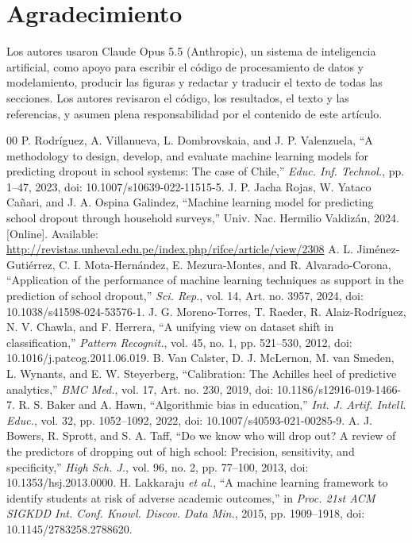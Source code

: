 \documentclass[conference]{IEEEtran}
\begin{document}
\section*{Agradecimiento}
Los autores usaron Claude Opus 5.5 (Anthropic), un sistema de inteligencia artificial, como apoyo para escribir el código de procesamiento de datos y modelamiento, producir las figuras y redactar y traducir el texto de todas las secciones. Los autores revisaron el código, los resultados, el texto y las referencias, y asumen plena responsabilidad por el contenido de este artículo.

\begin{thebibliography}{00}
 P. Rodríguez, A. Villanueva, L. Dombrovskaia, and J. P. Valenzuela, ``A methodology to design, develop, and evaluate machine learning models for predicting dropout in school systems: The case of Chile,'' \textit{Educ. Inf. Technol.}, pp. 1--47, 2023, doi: 10.1007/s10639-022-11515-5.
 J. P. Jacha Rojas, W. Yataco Cañari, and J. A. Ospina Galindez, ``Machine learning model for predicting school dropout through household surveys,'' Univ. Nac. Hermilio Valdizán, 2024. [Online]. Available: \url{http://revistas.unheval.edu.pe/index.php/rifce/article/view/2308}
 A. L. Jiménez-Gutiérrez, C. I. Mota-Hernández, E. Mezura-Montes, and R. Alvarado-Corona, ``Application of the performance of machine learning techniques as support in the prediction of school dropout,'' \textit{Sci. Rep.}, vol. 14, Art. no. 3957, 2024, doi: 10.1038/s41598-024-53576-1.
 J. G. Moreno-Torres, T. Raeder, R. Alaiz-Rodríguez, N. V. Chawla, and F. Herrera, ``A unifying view on dataset shift in classification,'' \textit{Pattern Recognit.}, vol. 45, no. 1, pp. 521--530, 2012, doi: 10.1016/j.patcog.2011.06.019.
 B. Van Calster, D. J. McLernon, M. van Smeden, L. Wynants, and E. W. Steyerberg, ``Calibration: The Achilles heel of predictive analytics,'' \textit{BMC Med.}, vol. 17, Art. no. 230, 2019, doi: 10.1186/s12916-019-1466-7.
 R. S. Baker and A. Hawn, ``Algorithmic bias in education,'' \textit{Int. J. Artif. Intell. Educ.}, vol. 32, pp. 1052--1092, 2022, doi: 10.1007/s40593-021-00285-9.
 A. J. Bowers, R. Sprott, and S. A. Taff, ``Do we know who will drop out? A review of the predictors of dropping out of high school: Precision, sensitivity, and specificity,'' \textit{High Sch. J.}, vol. 96, no. 2, pp. 77--100, 2013, doi: 10.1353/hsj.2013.0000.
 H. Lakkaraju \textit{et al.}, ``A machine learning framework to identify students at risk of adverse academic outcomes,'' in \textit{Proc. 21st ACM SIGKDD Int. Conf. Knowl. Discov. Data Min.}, 2015, pp. 1909--1918, doi: 10.1145/2783258.2788620.

\end{thebibliography}
\end{document}
